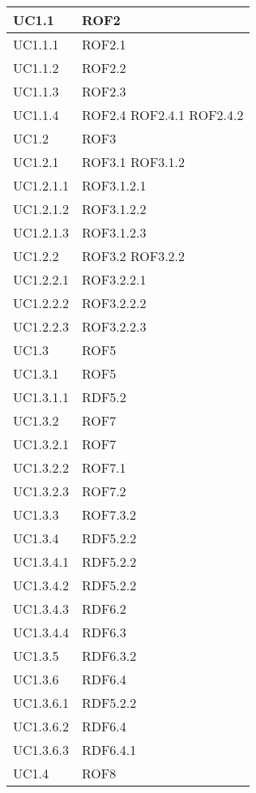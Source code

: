 \begin{center}
\begin{longtable}{| p{4cm} | p{4cm} |}
	UC1.1  &  ROF2 \\
	\hline
	UC1.1.1  &  ROF2.1 \\
	\hline
	UC1.1.2  &  ROF2.2 \\
	\hline
	UC1.1.3  &  ROF2.3 \\
	\hline
	UC1.1.4  &  ROF2.4 \newline ROF2.4.1 \newline ROF2.4.2\\
	\hline
	UC1.2  &  ROF3 \\
	\hline
	UC1.2.1  &  ROF3.1 \newline ROF3.1.2 \\
	\hline
	UC1.2.1.1  &  ROF3.1.2.1  \\
	\hline
	UC1.2.1.2  &  ROF3.1.2.2  \\
	\hline
	UC1.2.1.3  &  ROF3.1.2.3  \\
	\hline
	UC1.2.2  &  ROF3.2 \newline ROF3.2.2 \\
	\hline
	UC1.2.2.1  &  ROF3.2.2.1 \\
	\hline
	UC1.2.2.2  &  ROF3.2.2.2 \\
	\hline
	UC1.2.2.3  &  ROF3.2.2.3 \\
	\hline	
	UC1.3  &  ROF5 \\
	\hline
	UC1.3.1  &  ROF5 \\
	\hline
	UC1.3.1.1  &  RDF5.2 \\
	\hline
	UC1.3.2  &  ROF7 \\
	\hline
	UC1.3.2.1  &  ROF7 \\
	\hline
	UC1.3.2.2  &  ROF7.1 \\
	\hline
	UC1.3.2.3  &  ROF7.2 \\
	\hline
	UC1.3.3  &  ROF7.3.2 \\
	\hline
	UC1.3.4  &  RDF5.2.2 \\
	\hline
	UC1.3.4.1  &  RDF5.2.2 \\
	\hline
	UC1.3.4.2  &  RDF5.2.2 \\
	\hline
	UC1.3.4.3  &  RDF6.2 \\
	\hline
	UC1.3.4.4  &  RDF6.3 \\
	\hline
	UC1.3.5  &  RDF6.3.2 \\
	\hline
	UC1.3.6  &  RDF6.4 \\
	\hline
	UC1.3.6.1  &  RDF5.2.2 \\
	\hline
	UC1.3.6.2  &  RDF6.4 \\
	\hline
	UC1.3.6.3  &  RDF6.4.1 \\
	\hline
	UC1.4  &  ROF8 \\

\end{longtable}
\end{center}
